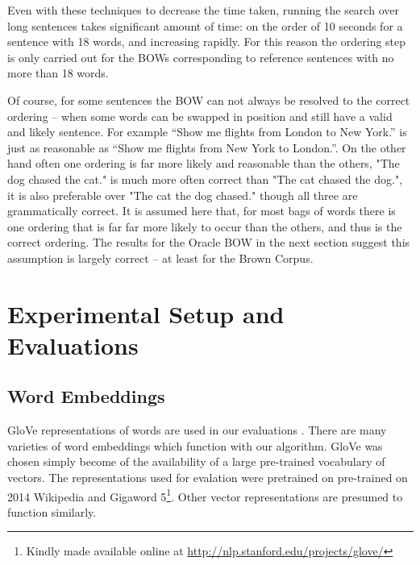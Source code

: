 \documentclass[11pt]{article}
\theoremstyle{plain}
\theoremstyle{definition}
\begin{document}
Even with these techniques to decrease the time taken, running the search over long sentences takes significant amount of time: on the order of 10 seconds for a sentence with 18 words, and increasing rapidly. For this reason the ordering step is only carried out for the BOWs corresponding to reference sentences with no more than 18 words.
 
  
Of course, for some sentences the BOW can not always be resolved to the correct ordering -- when some words can be swapped in position and still have a valid and likely sentence. For example ``Show me flights from London to New York.'' is just as reasonable as  ``Show me flights from New York to London.''. On the other hand often one ordering is far more likely and reasonable than the others, "The dog chased the cat." is much more often correct than "The cat chased the dog.", it is also preferable over "The cat the dog chased." though all three are grammatically correct. It is assumed here that, for most bags of words there is one ordering that is far far more likely to occur than the others, and thus is the correct ordering. The results for the Oracle BOW in the next section suggest this assumption is largely correct -- at least for the Brown Corpus.

  



\section{Experimental Setup and Evaluations} \label{evalsettings}

\subsection{Word Embeddings}
GloVe representations of words are used in our evaluations \parencite{pennington2014glove}. There are many varieties of word embeddings which function with our algorithm. GloVe was chosen simply become of the availability of a large pre-trained vocabulary of vectors. The representations used for evalation were pretrained on pre-trained on 2014 Wikipedia and Gigaword 5\footnote{Kindly made available online at \url{http://nlp.stanford.edu/projects/glove/}}.  Other vector representations are presumed to function similarly.
\end{document}
